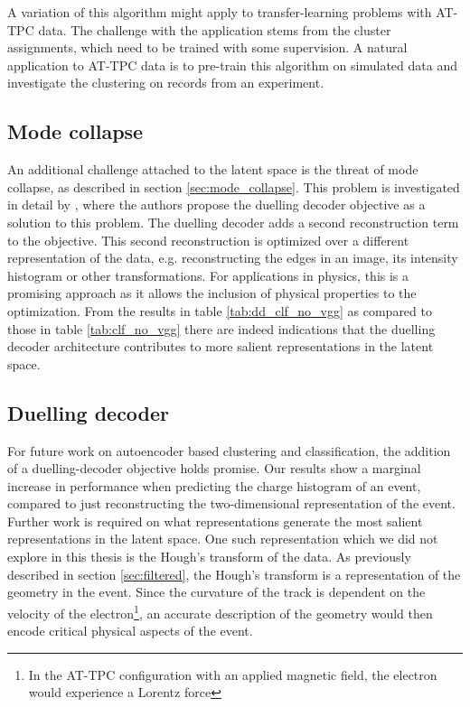 {A variation of this algorithm might apply to transfer-learning problems with AT-TPC data. The challenge with the application stems from the cluster assignments, which need to be trained with some supervision. A natural application to AT-TPC data is to pre-train this algorithm on simulated data and investigate the clustering on records from an experiment. 

\subsection{Mode collapse}

An additional challenge attached to the latent space is the threat of mode collapse, as described in section \ref{sec:mode_collapse}. This problem is investigated in detail by \citet{Seybold2019}, where the authors propose the duelling decoder objective as a solution to this problem. The duelling decoder adds a second reconstruction term to the objective. This second reconstruction is optimized over a different representation of the data, e.g. reconstructing the edges in an image, its intensity histogram or other transformations. For applications in physics, this is a promising approach as it allows the inclusion of physical properties to the optimization. From the results in table \ref{tab:dd_clf_no_vgg} as compared to those in table \ref{tab:clf_no_vgg} there are indeed indications that the duelling decoder architecture contributes to more salient representations in the latent space. 

\subsection{Duelling decoder}

For future work on autoencoder based clustering and classification, the addition of a duelling-decoder objective holds promise. Our results show a marginal increase in performance when predicting the charge histogram of an event, compared to just reconstructing the two-dimensional representation of the event. Further work is required on what representations generate the most salient representations in the latent space. One such representation which we did not explore in this thesis is the Hough's transform of the data. As previously described in section \ref{sec:filtered}, the Hough's transform is a representation of the geometry in the event. Since the curvature of the track is dependent on the velocity of the electron\footnote{In the AT-TPC configuration with an applied magnetic field, the electron would experience a Lorentz force}, an accurate description of the geometry would then encode critical physical aspects of the event.


}
